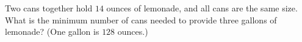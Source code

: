 Two cans together hold $14$ ounces of lemonade, and all cans are the same size. What is the minimum number of cans needed to provide three gallons of lemonade? (One gallon is $128$ ounces.)
